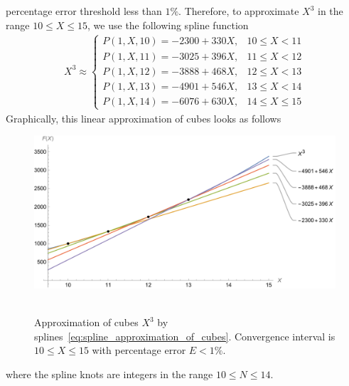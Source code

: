 percentage error threshold less than $1\%$.
Therefore, to approximate $X^3$ in the range $10 \leq X \leq 15$, we use the following spline function
\begin{align}
    X^3 \approx
    \begin{cases}
        P(1,X,10) = -2300 + 330X, & 10 \leq X < 11 \\
        P(1,X,11) = -3025 + 396X, & 11 \leq X < 12 \\
        P(1,X,12) = -3888 + 468X, & 12 \leq X < 13 \\
        P(1,X,13) = -4901 + 546X, & 13 \leq X < 14 \\
        P(1,X,14) = -6076 + 630X, & 14 \leq X \leq 15
    \end{cases}
    \label{eq:spline_approximation_of_cubes}
\end{align}
Graphically, this linear approximation of cubes looks as follows
\begin{figure}[H]
    \centering
    \includegraphics[width=1\textwidth]{sections/images/08_plots_of_cubes_power_with_p_2_10_15}
    ~\caption{
        Approximation of cubes $X^3$ by splines~\eqref{eq:spline_approximation_of_cubes}.
        Convergence interval is $10 \leq X \leq 15$ with percentage error $E < 1\%$.
    }
    \label{fig:08_plots_of_cubes_power_with_p_2_10_15}
\end{figure}
where the spline knots are integers in the range $10 \leq N \leq 14$.

